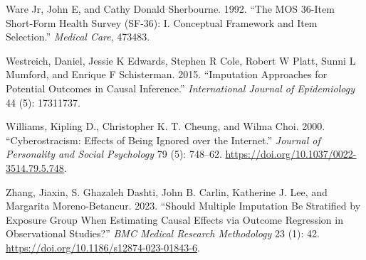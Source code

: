 \documentclass[
  singlecolumn]{report}
\newlength{\cslhangindent}
\newlength{\cslentryspacingunit} %
\newenvironment{CSLReferences}[2] %
 {%
  \setlength{\parindent}{0pt}
  \ifodd #1
  \let\oldpar\par
  \def\par{\hangindent=\cslhangindent\oldpar}
  \fi
  \setlength{\parskip}{#2\cslentryspacingunit}
 }%
 {}
\begin{document}
\begin{CSLReferences}{1}{0}
\leavevmode{}%
Ware Jr, John E, and Cathy Donald Sherbourne. 1992. {``The MOS 36-Item
Short-Form Health Survey (SF-36): I. Conceptual Framework and Item
Selection.''} \emph{Medical Care}, 473483.

\leavevmode{}%
Westreich, Daniel, Jessie K Edwards, Stephen R Cole, Robert W Platt,
Sunni L Mumford, and Enrique F Schisterman. 2015. {``Imputation
Approaches for Potential Outcomes in Causal Inference.''}
\emph{International Journal of Epidemiology} 44 (5): 17311737.

\leavevmode{}%
Williams, Kipling D., Christopher K. T. Cheung, and Wilma Choi. 2000.
{``Cyberostracism: Effects of Being Ignored over the Internet.''}
\emph{Journal of Personality and Social Psychology} 79 (5): 748--62.
\url{https://doi.org/10.1037/0022-3514.79.5.748}.

\leavevmode{}%
Zhang, Jiaxin, S. Ghazaleh Dashti, John B. Carlin, Katherine J. Lee, and
Margarita Moreno-Betancur. 2023. {``Should Multiple Imputation Be
Stratified by Exposure Group When Estimating Causal Effects via Outcome
Regression in Observational Studies?''} \emph{BMC Medical Research
Methodology} 23 (1): 42.
\url{https://doi.org/10.1186/s12874-023-01843-6}.

\end{CSLReferences}
\end{document}
